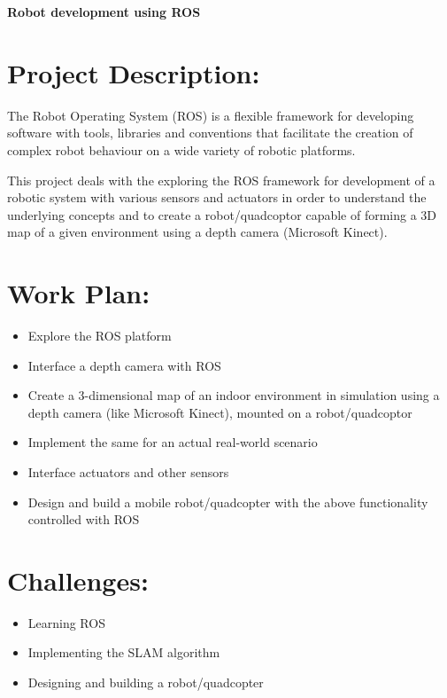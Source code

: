 \documentclass{article}
\begin{document}
	\begin{center}
		\huge\textbf{Robot development using ROS}
	\end{center}
	
	\hrulefill
	
	\section*{Project Description:}
		The Robot Operating System (ROS) is a flexible framework for developing software  with tools, libraries and conventions that facilitate the creation of complex robot behaviour on a wide variety of robotic platforms.	
		\newline
		
		\noindent This project deals with the exploring the ROS framework for development of a robotic system with various sensors and actuators in order to understand the underlying concepts and to create a robot/quadcoptor capable of forming a 3D map of a given environment using a depth camera (Microsoft Kinect).
		\newline
			
	\section*{Work Plan:}
	\begin{itemize}
		\item Explore the ROS platform
		\item Interface a depth camera with ROS
		\item Create a 3-dimensional map of an indoor environment in simulation using a depth camera (like Microsoft Kinect), mounted on a robot/quadcoptor
		\item Implement the same for an actual real-world scenario
		
		\item Interface actuators and other sensors 
		\item Design and build a mobile robot/quadcopter with the above functionality controlled with ROS 
	\end{itemize}

	\section*{Challenges:}
	\begin{itemize}
		\item Learning ROS
		\item Implementing the SLAM algorithm
		\item Designing and building a robot/quadcopter
	\end{itemize}
	
\end{document}
